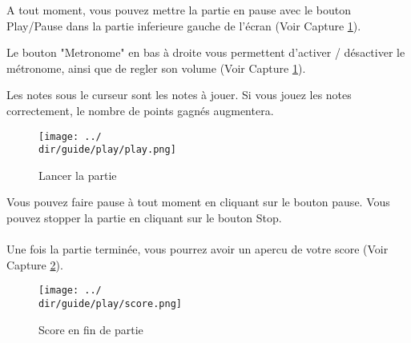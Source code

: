 A tout moment, vous pouvez mettre la partie en pause avec le bouton Play/Pause dans la partie inferieure gauche de l'écran (Voir Capture \ref{fig:play}).

Le bouton "Metronome" en bas à droite vous permettent d'activer / désactiver le métronome, ainsi que de regler son volume (Voir Capture \ref{fig:play}).

Les notes sous le curseur sont les notes à jouer. Si vous jouez les notes correctement, le nombre de points gagnés augmentera.

\begin{figure}[H]
	\texttt{[image: ../\\dir/guide/play/play.png]}
	\caption{Lancer la partie}
	\label{fig:play}
\end{figure}

Vous pouvez faire pause à tout moment en cliquant sur le bouton pause. Vous pouvez stopper la partie en cliquant sur le bouton Stop.
\\\\
Une fois la partie terminée, vous pourrez avoir un apercu de votre score (Voir Capture \ref{fig:score}).

\begin{figure}[H]
	\texttt{[image: ../\\dir/guide/play/score.png]}
	\caption{Score en fin de partie}
	\label{fig:score}
\end{figure}